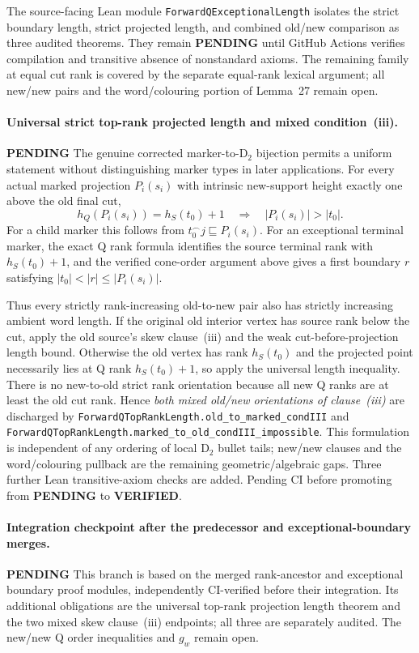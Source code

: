 \documentclass[11pt]{article}
\newcommand{\ok}{\textcolor{green!40!black}{\textbf{VERIFIED}}}
\newcommand{\todo}{\textcolor{gray!70!black}{\textbf{PENDING}}}
\newcommand{\lean}[1]{\texttt{#1}}
\begin{document}
The source-facing Lean module
\lean{ForwardQExceptionalLength} isolates the
strict boundary length, strict projected length, and
combined old/new comparison as three audited theorems.
They remain \textbf{PENDING} until GitHub Actions verifies
compilation and transitive absence of nonstandard axioms.
The remaining family at equal cut rank is covered by the
separate equal-rank lexical argument; all new/new pairs
and the word/colouring portion of Lemma~27 remain open.

\paragraph{Universal strict top-rank projected length and mixed condition~(iii).} \todo
The genuine corrected marker-to-D$_2$ bijection permits a
uniform statement without distinguishing marker types in later
applications. For every actual marked projection $P_i(s_i)$ with
intrinsic new-support height exactly one above the old final cut,
\[
 h_Q(P_i(s_i))=h_S(t_0)+1
 \quad\Longrightarrow\quad
 |P_i(s_i)|>|t_0|.
\]
For a child marker this follows from
$t_0^\frown j\sqsubseteq P_i(s_i)$.
For an exceptional terminal marker, the exact Q rank formula
identifies the source terminal rank with $h_S(t_0)+1$,
and the verified cone-order argument above gives a first
boundary $r$ satisfying $|t_0|<|r|\le|P_i(s_i)|$.

Thus every strictly rank-increasing old-to-new pair also has
strictly increasing ambient word length. If the original old
interior vertex has source rank below the cut, apply the
old source's skew clause~(iii) and the weak cut-before-projection
length bound. Otherwise the old vertex has rank $h_S(t_0)$
and the projected point necessarily lies at Q rank
$h_S(t_0)+1$, so apply the universal length inequality.
There is no new-to-old strict rank orientation because all
new Q ranks are at least the old cut rank.
Hence \emph{both mixed old/new orientations of clause~(iii)}
are discharged by
\lean{ForwardQTopRankLength.old\_to\_marked\_condIII}
and
\lean{ForwardQTopRankLength.marked\_to\_old\_condIII\_impossible}.
This formulation is independent of any ordering of local
D$_2$ bullet tails; new/new clauses and the word/colouring
pullback are the remaining geometric/algebraic gaps.
Three further Lean transitive-axiom checks are added.
Pending CI before promoting from \todo{} to \ok{}.

\paragraph{Integration checkpoint after the predecessor and exceptional-boundary merges.} \todo
This branch is based on the merged rank-ancestor and exceptional
boundary proof modules, independently CI-verified before their
integration. Its additional obligations are the universal
top-rank projection length theorem and the two mixed skew
clause~(iii) endpoints; all three are separately audited.
The new/new Q order inequalities and $g_w$ remain open.
\end{document}
